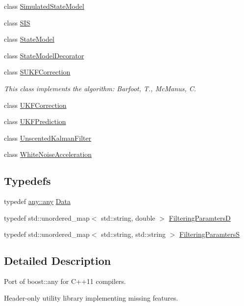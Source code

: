 \begin{DoxyCompactItemize}
class \mbox{\hyperlink{classbfl_1_1SimulatedStateModel}{Simulated\+State\+Model}}
\item 
class \mbox{\hyperlink{classbfl_1_1SIS}{S\+IS}}
\item 
class \mbox{\hyperlink{classbfl_1_1StateModel}{State\+Model}}
\item 
class \mbox{\hyperlink{classbfl_1_1StateModelDecorator}{State\+Model\+Decorator}}
\item 
class \mbox{\hyperlink{classbfl_1_1SUKFCorrection}{S\+U\+K\+F\+Correction}}
\begin{DoxyCompactList}\small\item\em This class implements the algorithm\+: Barfoot, T., Mc\+Manus, C. \end{DoxyCompactList}\item 
class \mbox{\hyperlink{classbfl_1_1UKFCorrection}{U\+K\+F\+Correction}}
\item 
class \mbox{\hyperlink{classbfl_1_1UKFPrediction}{U\+K\+F\+Prediction}}
\item 
class \mbox{\hyperlink{classbfl_1_1UnscentedKalmanFilter}{Unscented\+Kalman\+Filter}}
\item 
class \mbox{\hyperlink{classbfl_1_1WhiteNoiseAcceleration}{White\+Noise\+Acceleration}}
\end{DoxyCompactItemize}
\subsection*{Typedefs}
\begin{DoxyCompactItemize}
\item 
typedef \mbox{\hyperlink{classbfl_1_1any_1_1any}{any\+::any}} \mbox{\hyperlink{namespacebfl_af6b103c6821db1b54452f776fdd9dd02}{Data}}
\item 
typedef std\+::unordered\+\_\+map$<$ std\+::string, double $>$ \mbox{\hyperlink{namespacebfl_aeab050cf5b080512a10c1fec72921f0c}{Filtering\+ParamtersD}}
\item 
typedef std\+::unordered\+\_\+map$<$ std\+::string, std\+::string $>$ \mbox{\hyperlink{namespacebfl_aaa1677d9f16c84aac08a5a0bf36a0fa6}{Filtering\+ParamtersS}}
\end{DoxyCompactItemize}


\subsection{Detailed Description}
Port of boost\+::any for C++11 compilers. 

Header-\/only utility library implementing missing features.

